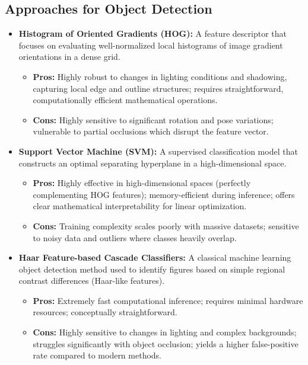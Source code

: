 \documentclass[12pt]{article}
\begin{document}
\subsection*{Approaches for Object Detection}
\begin{itemize}
    \item \textbf{Histogram of Oriented Gradients (HOG):} A feature descriptor that focuses on evaluating well-normalized local histograms of image gradient orientations in a dense grid.
    \begin{itemize}
        \item \textbf{Pros:} Highly robust to changes in lighting conditions and shadowing, capturing local edge and outline structures; requires straightforward, computationally efficient mathematical operations.
        \item \textbf{Cons:} Highly sensitive to significant rotation and pose variations; vulnerable to partial occlusions which disrupt the feature vector.
    \end{itemize}
    
    \item \textbf{Support Vector Machine (SVM):} A supervised classification model that constructs an optimal separating hyperplane in a high-dimensional space.
    \begin{itemize}
        \item \textbf{Pros:} Highly effective in high-dimensional spaces (perfectly complementing HOG features); memory-efficient during inference; offers clear mathematical interpretability for linear optimization.
        \item \textbf{Cons:} Training complexity scales poorly with massive datasets; sensitive to noisy data and outliers where classes heavily overlap.
    \end{itemize}

    \item \textbf{Haar Feature-based Cascade Classifiers:} A classical machine learning object detection method used to identify figures based on simple regional contrast differences (Haar-like features).
    \begin{itemize}
        \item \textbf{Pros:} Extremely fast computational inference; requires minimal hardware resources; conceptually straightforward.
        \item \textbf{Cons:} Highly sensitive to changes in lighting and complex backgrounds; struggles significantly with object occlusion; yields a higher false-positive rate compared to modern methods.
    \end{itemize}
    

\end{itemize}
\end{document}
